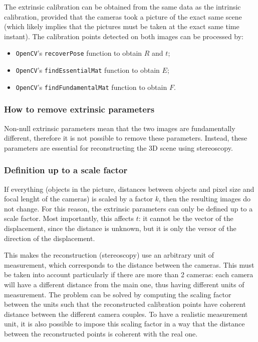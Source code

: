 The extrinsic calibration can be obtained from the same data as the intrinsic calibration, provided that the cameras took a picture of the exact same scene (which likely implies that the pictures must be taken at the exact same time instant).
The calibration points detected on both images can be processed by:
\begin{itemize}
	\itemsep 0em
	\item \texttt{OpenCV}'s \texttt{recoverPose} function to obtain $R$ and $t$;
	\item \texttt{OpenCV}'s \texttt{findEssentialMat} function to obtain $E$;
	\item \texttt{OpenCV}'s \texttt{findFundamentalMat} function to obtain $F$.
\end{itemize}

\subsubsection{How to remove extrinsic parameters}

Non-null extrinsic parameters mean that the two images are fundamentally different, therefore it is not possible to remove these parameters.
Instead, these parameters are essential for reconstructing the 3D scene using stereoscopy.

\subsubsection{Definition up to a scale factor}

If everything (objects in the picture, distances between objects and pixel size and focal lenght of the cameras) is scaled by a factor $k$, then the resulting images do not change.
For this reason, the extrinsic parameters can only be defined up to a scale factor.
Most importantly, this affects $t$: it cannot be the vector of the displacement, since the distance is unknown, but it is only the versor of the direction of the displacement.

This makes the reconstruction (stereoscopy) use an arbitrary unit of measurement, which corresponds to the distance between the cameras.
This must be taken into account particularly if there are more than 2 cameras: each camera will have a different distance from the main one, thus having different units of measurement.
The problem can be solved by computing the scaling factor between the units such that the reconstructed calibration points have coherent distance between the different camera couples.
To have a realistic measurement unit, it is also possible to impose this scaling factor in a way that the distance between the reconstructed points is coherent with the real one.
